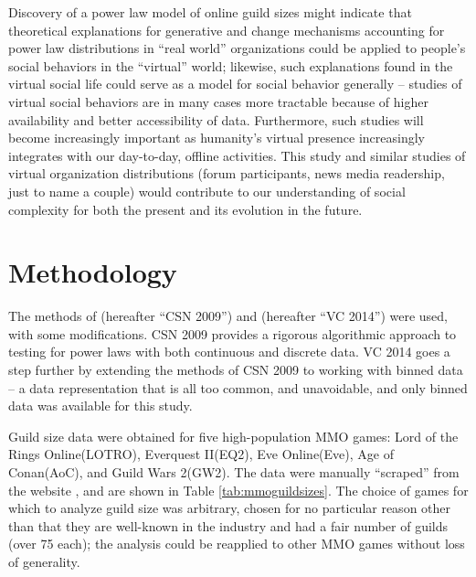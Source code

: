 \documentclass[pdftex,12pt]{llncs}
\begin{document}
Discovery of a power law model of online guild sizes might indicate that theoretical explanations for generative and change mechanisms accounting for power law distributions in “real world” organizations could be applied to people’s social behaviors in the “virtual” world; likewise, such explanations found in the virtual social life could serve as a model for social behavior generally – studies of virtual social behaviors are in many cases more tractable because of higher availability and better accessibility of data.
Furthermore, such studies will become increasingly important as humanity’s virtual presence increasingly integrates with our day-to-day, offline activities.
This study and similar studies of virtual organization distributions (forum participants, news media readership, just to name a couple) would contribute to our understanding of social complexity for both the present and its evolution in the future.

\section{Methodology}
The methods of \parencite{CSN2009} (hereafter “CSN 2009”) and \parencite{VC2014} (hereafter “VC 2014”) were used, with some modifications.
CSN 2009 provides a rigorous algorithmic approach to testing for power laws with both continuous and discrete data.
VC 2014 goes a step further by extending the methods of CSN 2009 to working with binned data – a data representation that is all too common, and unavoidable, and only binned data was available for this study.

Guild size data were obtained for five high-population MMO games:  Lord of the Rings Online\texttrademark (LOTRO), Everquest II\texttrademark (EQ2), Eve Online\texttrademark (Eve), Age of Conan\texttrademark (AoC), and Guild Wars 2\texttrademark (GW2).  The data were manually “scraped” from the website \parencite{mmorpg2014}, and are shown in Table \ref{tab:mmoguildsizes}.  The choice of games for which to analyze guild size was arbitrary, chosen for no particular reason other than that they are well-known in the industry and had a fair number of guilds (over 75 each); the analysis could be reapplied to other MMO games without loss of generality.
\end{document}

